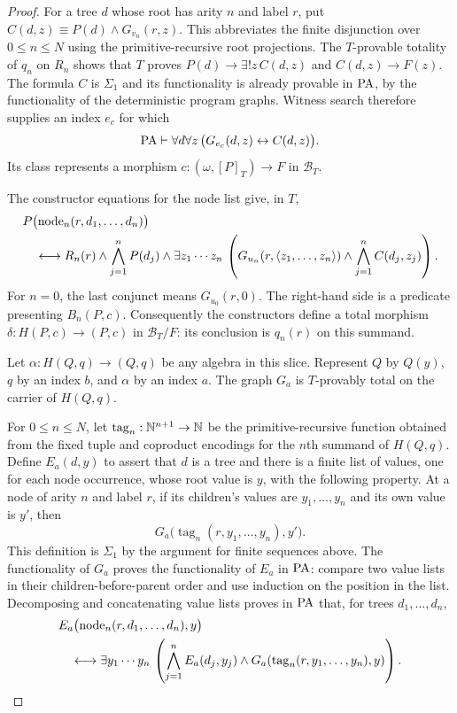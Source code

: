 \begin{proof}
For a tree $d$ whose root has arity $n$ and label $r$, put
$C(d,z)\equiv P(d)\land G_{v_n}(r,z)$.
This abbreviates the finite disjunction over $0\leq n\leq N$
using the primitive-recursive root projections.
The $T$-provable totality of $q_n$ on $R_n$ shows that
$T$ proves $P(d)\to\exists!z\,C(d,z)$ and
$C(d,z)\to F(z)$.
The formula $C$ is $\Sigma_1$ and its functionality is already
provable in $\mathrm{PA}$, by the functionality of the deterministic
program graphs.  Witness search therefore supplies an index
$e_c$ for which
\[
 \mathrm{PA}\vdash\forall d\forall z\,
             \bigl(G_{e_c}(d,z)\leftrightarrow C(d,z)\bigr).
\]
Its class represents a morphism $c:(\omega,[P]_T)\to F$ in
$\mathcal B_T$.

The constructor equations for the node list give, in $T$,
\begin{align}
 &P\bigl(\operatorname{node}_n(r,d_1,\ldots,d_n)\bigr)
                                                        \label{eq:syntactic-derivation-domain}\\
 &\quad\longleftrightarrow
 R_n(r)\land\bigwedge_{j=1}^{n}P(d_j)\land
 \exists z_1\cdots z_n\,
 \left(G_{u_n}(r,\langle z_1,\ldots,z_n\rangle)
       \land\bigwedge_{j=1}^{n}C(d_j,z_j)\right).
 \notag
\end{align}
For $n=0$, the last conjunct means $G_{u_0}(r,0)$.
The right-hand side is a predicate presenting
$B_n(P,c)$.  Consequently the constructors define a total
morphism $\delta:H(P,c)\to(P,c)$ in $\mathcal B_T/F$:
its conclusion is $q_n(r)$ on this summand.

Let $\alpha:H(Q,q)\to(Q,q)$ be any algebra in this slice.
Represent $Q$ by $Q(y)$, $q$ by an index $b$, and $\alpha$ by
an index $a$. The graph $G_a$ is $T$-provably total on the
carrier of $H(Q,q)$.

For $0\leq n\leq N$, let $\operatorname{tag}_n:\mathbb N^{n+1}\to\mathbb N$
be the primitive-recursive function obtained from the fixed tuple
and coproduct encodings for the $n$th summand of $H(Q,q)$.
Define $E_a(d,y)$ to assert that $d$ is a tree and there is a
finite list of values, one for each node occurrence, whose root
value is $y$, with the following property.  At a node of arity
$n$ and label $r$, if its children's values are
$y_1,\ldots,y_n$ and its own value is $y'$, then
\[
 G_a\bigl(\operatorname{tag}_n(r,y_1,\ldots,y_n),y'\bigr).
\]
This definition is $\Sigma_1$ by
the argument for finite sequences above.  The functionality of $G_a$
proves the functionality of $E_a$ in $\mathrm{PA}$: compare two value
lists in their children-before-parent order and use induction on
the position in the list.
Decomposing and concatenating value lists proves in $\mathrm{PA}$ that,
for trees $d_1,\ldots,d_n$,
\begin{align}
 &E_a\bigl(\operatorname{node}_n(r,d_1,\ldots,d_n),y\bigr)
                                                        \label{eq:syntactic-derivation-fold}\\
 &\quad\longleftrightarrow
 \exists y_1\cdots y_n\,
 \left(\bigwedge_{j=1}^{n}E_a(d_j,y_j)
       \land G_a(\operatorname{tag}_n(r,y_1,\ldots,y_n),y)
 \right).
 \notag
\end{align}


\end{proof}
